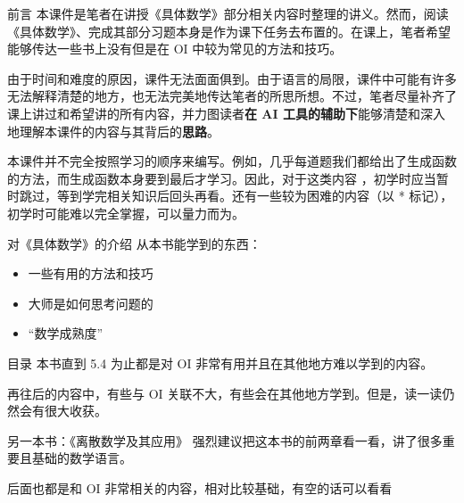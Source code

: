 
\begin{frame}{前言}
    本课件是笔者在讲授《具体数学》部分相关内容时整理的讲义。然而，阅读《具体数学》、完成其部分习题本身是作为课下任务去布置的。在课上，笔者希望能够传达一些书上没有但是在 OI 中较为常见的方法和技巧。

    由于时间和难度的原因，课件无法面面俱到。由于语言的局限，课件中可能有许多无法解释清楚的地方，也无法完美地传达笔者的所思所想。不过，笔者尽量补齐了课上讲过和希望讲的所有内容，并力图读者\textbf{在 AI 工具的辅助下}能够清楚和深入地理解本课件的内容与其背后的\textbf{思路}。

    本课件并不完全按照学习的顺序来编写。例如，几乎每道题我们都给出了生成函数的方法，而生成函数本身要到最后才学习。因此，对于这类内容
    ，初学时应当暂时跳过，等到学完相关知识后回头再看。还有一些较为困难的内容（以 * 标记），初学时可能难以完全掌握，可以量力而为。
\end{frame}
\begin{frame}{对《具体数学》的介绍}
    从本书能学到的东西：

    \begin{itemize}
        \item 一些有用的方法和技巧
        \item 大师是如何思考问题的
        \item “数学成熟度”
    \end{itemize}
\end{frame}
\begin{frame}{目录}
    本书直到 5.4 为止都是对 OI 非常有用并且在其他地方难以学到的内容。

    再往后的内容中，有些与 OI 关联不大，有些会在其他地方学到。但是，读一读仍然会有很大收获。
\end{frame}

\begin{frame}{另一本书：《离散数学及其应用》}
    强烈建议把这本书的前两章看一看，讲了很多重要且基础的数学语言。

    后面也都是和 OI 非常相关的内容，相对比较基础，有空的话可以看看
\end{frame}

